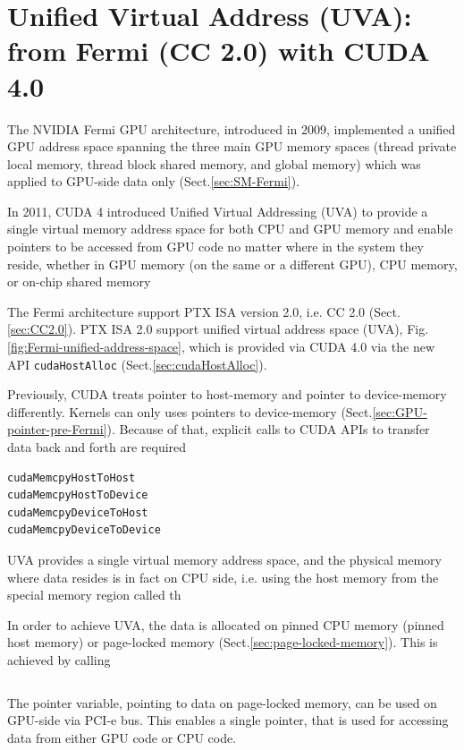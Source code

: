 \section{Unified Virtual Address (UVA): from Fermi (CC 2.0) with CUDA 4.0}
\label{sec:UVA}
\label{sec:cuda4_UVA}


The NVIDIA Fermi GPU architecture, introduced in 2009, implemented a unified GPU
address space spanning the three main GPU memory spaces (thread private local
memory, thread block shared memory, and global memory) which was applied to
GPU-side data only (Sect.\ref{sec:SM-Fermi}).

In 2011, CUDA 4 introduced Unified Virtual Addressing (UVA) to provide a single
virtual memory address space for both CPU and GPU memory and enable pointers to
be accessed from GPU code no matter where in the system they reside, whether in
GPU memory (on the same or a different GPU), CPU memory, or on-chip shared
memory

The Fermi architecture support PTX ISA version 2.0, i.e. CC 2.0
(Sect.\ref{sec:CC2.0}).
PTX ISA 2.0 support unified virtual address space (UVA),
Fig.\ref{fig:Fermi-unified-address-space}, which is provided via CUDA 4.0 via 
the new API \verb!cudaHostAlloc! (Sect.\ref{sec:cudaHostAlloc}).

\begin{mdframed}

Previously, CUDA treats pointer to host-memory and pointer to device-memory differently.
Kernels can only uses pointers to device-memory (Sect.\ref{sec:GPU-pointer-pre-Fermi}).
Because of that, explicit calls to CUDA APIs to transfer data back and forth are required
\begin{verbatim}
cudaMemcpyHostToHost
cudaMemcpyHostToDevice
cudaMemcpyDeviceToHost
cudaMemcpyDeviceToDevice
\end{verbatim}
\end{mdframed}

UVA provides a single virtual memory address space, and the physical memory
where data resides is in fact on CPU side, i.e.  using the host memory from the
special memory region called th

In order to achieve UVA, the data is allocated on pinned CPU memory (pinned host
memory) or page-locked memory (Sect.\ref{sec:page-locked-memory}). This is
achieved by calling
\begin{verbatim}

\end{verbatim}

The pointer variable, pointing to data on page-locked memory, can be used on
GPU-side via PCI-e bus. This enables a single pointer, that is used for
accessing data from either GPU code or CPU code.

